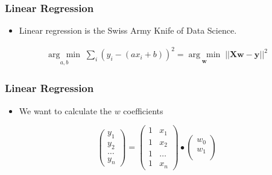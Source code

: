 \documentclass[handout]{beamer}
\newcommand{\argmin}[1]{\underset{#1}{\operatorname{arg}\,\operatorname{min}}\;}
\begin{document}
\begin{frame}[fragile]
    \frametitle{Linear Regression}
    \Large
    \begin{itemize}
        \item Linear regression is the Swiss Army Knife of Data Science.
    \end{itemize}
    \begin{align*}
        \argmin{a, b} \sum_i (y_i - (ax_i + b))^2 =
        \argmin{\boldsymbol{w}} || \boldsymbol{Xw} - \boldsymbol{y} ||^{2}
    \end{align*}
\end{frame}


\begin{frame}[fragile]
    \frametitle{Linear Regression}
    \Large
    \begin{itemize}
        \item We want to calculate the $w$ coefficients
    \end{itemize}
    \[ 
    \left(
    \begin{array}{c}
        y_1 \\
        y_2 \\
        \ldots \\
        y_n 
    \end{array}
    \right)
    = 
    \left(
    \begin{array}{ccc}
        1 & x_1 \\
        1 & x_2 \\
        1 & \ldots \\
        1 & x_n 
    \end{array}
    \right)
    \bullet
    \left(
    \begin{array}{ccc}
        w_0 \\
        w_1 \\
    \end{array}
    \right)
    \] 
\end{frame}
\end{document}

